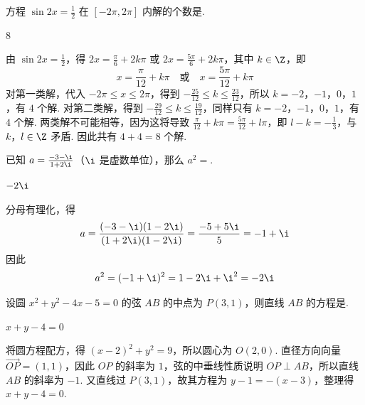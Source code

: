 \documentclass[UTF8,a4paper,oneside,11pt]{ctexbook}
\begin{document}
\begin{problem}
方程 \(\sin 2x=\frac{1}{2}\) 在 \([-2\pi,2\pi]\) 内解的个数是\fillinblank{}.
\end{problem}

\begin{answer}
8
\end{answer}

\begin{solution}
由 \(\sin 2x=\frac12\)，得 \(2x=\frac\pi6+2k\pi\) 或 \(2x=\frac{5\pi}{6}+2k\pi\)，其中 \(k\in\Z\)，即
\[
x=\frac\pi{12}+k\pi\quad\text{或}\quad x=\frac{5\pi}{12}+k\pi
\]
对第一类解，代入 \(-2\pi\leqslant x\leqslant2\pi\)，得到 \(-\frac{25}{12}\leqslant k\leqslant\frac{23}{12}\)，所以 \(k=-2\)，\(-1\)，\(0\)，\(1\)，有 \(4\) 个解. 对第二类解，得到 \(-\frac{29}{12}\leqslant k\leqslant\frac{19}{12}\)，同样只有 \(k=-2\)，\(-1\)，\(0\)，\(1\)，有 \(4\) 个解. 两类解不可能相等，因为这将导致 \(\frac\pi{12}+k\pi=\frac{5\pi}{12}+l\pi\)，即 \(l-k=-\frac13\)，与 \(k\)，\(l\in\Z\) 矛盾. 因此共有 \(4+4=8\) 个解.
\end{solution}

\begin{problem}
已知 \(a = \frac{-3 - \i}{1 + 2\i}\)（\(\i\) 是虚数单位），那么 \(a^{2} =\)\fillinblank{}.
\end{problem}

\begin{answer}
\(-2\i\)
\end{answer}

\begin{solution}
分母有理化，得
\[
a=\frac{(-3-\i)(1-2\i)}{(1+2\i)(1-2\i)}=\frac{-5+5\i}{5}=-1+\i
\]
因此
\[
a^2=(-1+\i)^2=1-2\i+\i^2=-2\i
\]
\end{solution}

\begin{problem}
设圆 \(x^{2} + y^{2} - 4x - 5 = 0\) 的弦 \(AB\) 的中点为 \(P(3,1)\)，则直线 \(AB\) 的方程是\fillinblank{}.
\end{problem}

\begin{answer}
\(x+y-4=0\)
\end{answer}

\begin{solution}
将圆方程配方，得 \((x-2)^2+y^2=9\)，所以圆心为 \(O(2,0)\). 直径方向向量 \(\overrightarrow{OP}=(1,1)\)，因此 \(OP\) 的斜率为 \(1\)，弦的中垂线性质说明 \(OP\perp AB\)，所以直线 \(AB\) 的斜率为 \(-1\). 又直线过 \(P(3,1)\)，故其方程为 \(y-1=-(x-3)\)，整理得 \(x+y-4=0\).
\end{solution}
\end{document}
